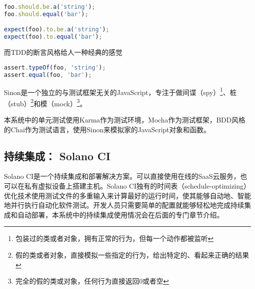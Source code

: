 \begin{lstlisting}[language={JavaScript}, caption={BDD风格的chai代码}]
foo.should.be.a('string');
foo.should.equal('bar');

expect(foo).to.be.a('string');
expect(foo).to.equal('bar');
\end{lstlisting}
而TDD的断言风格给人一种经典的感觉
\begin{lstlisting}[language={JavaScript}, caption={像自然语言一样的测试代码}]
assert.typeOf(foo, 'string');
assert.equal(foo, 'bar');
\end{lstlisting}

Sinon是一个独立的与测试框架无关的JavaScript，专注于做间谍（spy）\footnote{包装过的类或者对象，拥有正常的行为，但每一个动作都被监听}、桩（stub）\footnote{假的类或者对象，直接模拟一些指定的行为，给出特定的、看起来正确的结果}和模（mock）\footnote{完全的假的类或对象，任何行为直接返回0或者空}。

本系统中的单元测试使用Karma作为测试环境，Mocha作为测试框架，BDD风格的Chai作为测试语言，使用Sinon来模拟家的JavaScript对象和函数。
\subsection{持续集成： Solano CI}
Solano CI是一个持续集成和部署解决方案。可以直接使用在线的SaaS云服务，也可以在私有虚拟设备上搭建主机。Solano CI独有的时间表（schedule-optimizing）优化技术使用测试文件的多重输入来计算最好的运行时间，使其能够自动地、智能地并行执行自动化软件测试。开发人员只需要简单的配置就能够轻松地完成持续集成和自动部署，本系统中的持续集成使用情况会在后面的专门章节介绍。


